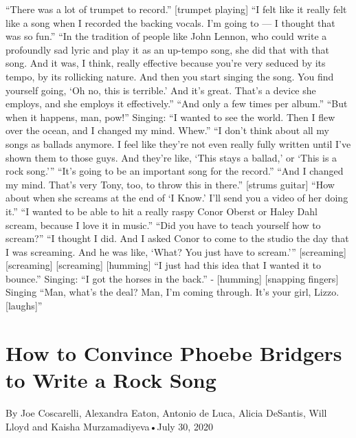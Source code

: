 \begin{itemize}
  ``There was a lot of trumpet to record.'' {[}trumpet playing{]} ``I
  felt like it really felt like a song when I recorded the backing
  vocals. I'm going to --- I thought that was so fun.'' ``In the
  tradition of people like John Lennon, who could write a profoundly sad
  lyric and play it as an up-tempo song, she did that with that song.
  And it was, I think, really effective because you're very seduced by
  its tempo, by its rollicking nature. And then you start singing the
  song. You find yourself going, `Oh no, this is terrible.' And it's
  great. That's a device she employs, and she employs it effectively.''
  ``And only a few times per album.'' ``But when it happens, man, pow!''
  Singing: ``I wanted to see the world. Then I flew over the ocean, and
  I changed my mind. Whew.'' ``I don't think about all my songs as
  ballads anymore. I feel like they're not even really fully written
  until I've shown them to those guys. And they're like, `This stays a
  ballad,' or `This is a rock song.''' ``It's going to be an important
  song for the record.'' ``And I changed my mind. That's very Tony, too,
  to throw this in there.'' {[}strums guitar{]} ``How about when she
  screams at the end of `I Know.' I'll send you a video of her doing
  it.'' ``I wanted to be able to hit a really raspy Conor Oberst or
  Haley Dahl scream, because I love it in music.'' ``Did you have to
  teach yourself how to scream?'' ``I thought I did. And I asked Conor
  to come to the studio the day that I was screaming. And he was like,
  `What? You just have to scream.''' {[}screaming{]} {[}screaming{]}
  {[}screaming{]} {[}humming{]} ``I just had this idea that I wanted it
  to bounce.'' Singing: ``I got the horses in the back.'' -
  {[}humming{]} {[}snapping fingers{]} Singing ``Man, what's the deal?
  Man, I'm coming through. It's your girl, Lizzo. {[}laughs{]}''
\end{itemize}

\hypertarget{how-to-convince-phoebe-bridgers-to-write-a-rock-song-1}{%
\section{How to Convince Phoebe Bridgers to Write a Rock
Song}\label{how-to-convince-phoebe-bridgers-to-write-a-rock-song-1}}

By Joe Coscarelli, Alexandra Eaton, Antonio de Luca, Alicia DeSantis,
Will Lloyd and Kaisha Murzamadiyeva•July 30, 2020

